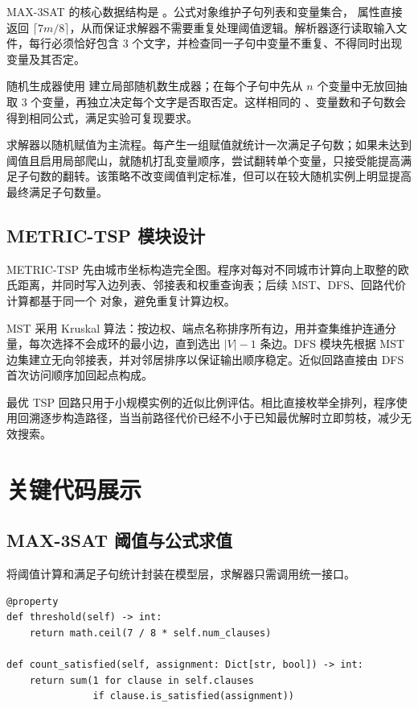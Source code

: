 \documentclass{sysucseexp}
\begin{document}
MAX-3SAT 的核心数据结构是 。公式对象维护子句列表和变量集合， 属性直接返回 $\lceil 7m/8\rceil$，从而保证求解器不需要重复处理阈值逻辑。解析器逐行读取输入文件，每行必须恰好包含 3 个文字，并检查同一子句中变量不重复、不得同时出现变量及其否定。

随机生成器使用  建立局部随机数生成器；在每个子句中先从 $n$ 个变量中无放回抽取 3 个变量，再独立决定每个文字是否取否定。这样相同的 、变量数和子句数会得到相同公式，满足实验可复现要求。

求解器以随机赋值为主流程。每产生一组赋值就统计一次满足子句数；如果未达到阈值且启用局部爬山，就随机打乱变量顺序，尝试翻转单个变量，只接受能提高满足子句数的翻转。该策略不改变阈值判定标准，但可以在较大随机实例上明显提高最终满足子句数量。

\subsection{METRIC-TSP 模块设计}

METRIC-TSP 先由城市坐标构造完全图。程序对每对不同城市计算向上取整的欧氏距离，并同时写入边列表、邻接表和权重查询表；后续 MST、DFS、回路代价计算都基于同一个  对象，避免重复计算边权。

MST 采用 Kruskal 算法：按边权、端点名称排序所有边，用并查集维护连通分量，每次选择不会成环的最小边，直到选出 $|V|-1$ 条边。DFS 模块先根据 MST 边集建立无向邻接表，并对邻居排序以保证输出顺序稳定。近似回路直接由 DFS 首次访问顺序加回起点构成。

最优 TSP 回路只用于小规模实例的近似比例评估。相比直接枚举全排列，程序使用回溯逐步构造路径，当当前路径代价已经不小于已知最优解时立即剪枝，减少无效搜索。

\section{关键代码展示}

\subsection{MAX-3SAT 阈值与公式求值}

 将阈值计算和满足子句统计封装在模型层，求解器只需调用统一接口。

{\small
\begin{verbatim}
@property
def threshold(self) -> int:
    return math.ceil(7 / 8 * self.num_clauses)

def count_satisfied(self, assignment: Dict[str, bool]) -> int:
    return sum(1 for clause in self.clauses
               if clause.is_satisfied(assignment))
\end{verbatim}
}
\end{document}
